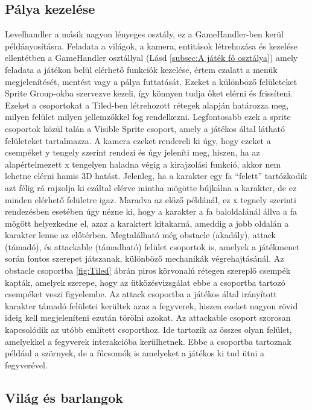 \subsection{Pálya kezelése} \label{subsec:Pálya kezelése}
\indent \indent Levelhandler a másik nagyon lényeges osztály, ez a GameHandler-ben kerül példányosításra. Feladata a világok, a kamera, entitások létrehozása és kezelése ellentétben a GameHandler osztállyal (Lásd \ref{subsec:A játék fő osztálya}) amely feladata a játékon belül elérhető funkciók kezelése, értem ezalatt a menük megjelenítését, mentést vagy a pálya futtatását. 
Ezeket a különböző felületeket Sprite Group-okba szervezve kezeli, így könnyen tudja őket elérni és frissíteni. Ezeket a csoportokat a Tiled-ben létrehozott rétegek alapján határozza meg, milyen felület milyen jellemzőkkel fog rendelkezni.
Legfontosabb ezek a sprite csoportok közül talán a Visible Sprite csoport, amely a játékos által látható felületeket tartalmazza. A kamera ezeket rendereli ki úgy, hogy ezeket a csempéket y tengely szerint rendezi és úgy jeleníti meg, hiszen, ha az alapértelmezett x tengelyen haladna végig a kirajzolási funkció, akkor nem lehetne elérni hamis 3D hatást. Jelenleg, ha a karakter egy fa ``felett'' tartózkodik azt félig rá rajzolja ki ezáltal elérve mintha mögötte bújkálna a karakter, de ez minden elérhető felületre igaz. Maradva az előző példánál, ez x tegnely szerinti rendezésben esetében úgy nézne ki, hogy a karakter a fa baloldalánál állva a fa mögött helyezkedne el, azaz a karaktert kitakarná, ameddig a jobb oldalán a karakter lenne az előtérben. 
Megtalálható még obstacle (akadály), attack (támadó), és attackable (támadható) felület csoportok is, amelyek a játékmenet során fontos szerepet játszanak, különböző mechanikák végrehajtásánál. Az obstacle csoportba \ref{fig:Tiled} ábrán piros körvonalú rétegen szereplő csempék kapták, amelyek szerepe, hogy az ütközésvizsgálat ebbe a csoportba tartozó csempéket veszi figyelembe. Az attack csoportba a játékos által irányított karakter támadó felületei kerültek azaz a fegyverek, hiszen ezeket nagyon rövid ideig kell megjeleníteni ezután törölni azokat. Az attackable csoport szorosan kapcsolódik az utóbb említett csoporthoz. Ide tartozik az összes olyan felület, amelyekkel a fegyverek interakcióba kerülhetnek. Ebbe a csoportba tartoznak például a szörnyek, de a fűcsomók is amelyeket a játékos ki tud ütni a fegyverével. 

\subsection{Világ és barlangok} \label{subsec:Világ és barlangok}

